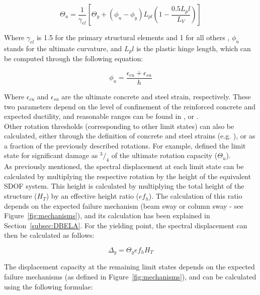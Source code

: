 \begin{equation}
	\Theta_u = \frac{1}{\gamma_{el}}\left[\Theta_y + (\phi_u-\phi_y)L_{pl}\left(1-\frac{0.5L_pl}{L_V}\right)\right]
\end{equation}

Where $\gamma_{el}$ is 1.5 for the primary structural elements and 1 for all others \citep{BorziEtAl2008b}, $\phi_u$ stands for the ultimate curvature, and $L_pl$ is the plastic hinge length, which can be computed through the following equation:

\begin{equation}
	\phi_u = \frac{\epsilon_{cu}+\epsilon_{su}}{h}
\end{equation}

Where $\epsilon_{cu}$ and $\epsilon_{su}$ are the ultimate concrete and steel strain, respectively. These two parameters depend on the level of confinement of the reinforced concrete and expected ductility, and reasonable ranges can be found in \cite{Calvi1999}, \cite{CrowleyEtAl2004} or \cite{BalEtAl2010}.\\

Other rotation thresholds (corresponding to other limit states) can also be calculated, either through the definition of concrete and steel strains (e.g. \cite{CrowleyEtAl2004}), or as a fraction of the previously described rotations. For example, \cite{BorziEtAl2008b} defined the limit state for significant damage as $^3/_4$ of the ultimate rotation capacity ($\Theta_u$).\\

As previously mentioned, the spectral displacement at each limit state can be calculated by multiplying the respective rotation by the height of the equivalent SDOF system. This height is calculated by multiplying the total height of the structure ($H_T$) by an effective height ratio ($ef_h$). The calculation of this ratio depends on the expected failure mechanism (beam sway or column sway - see Figure~\ref{fig:mechanisms}), and its calculation has been explained in Section~\ref{subsec:DBELA}. For the yielding point, the spectral displacement can then be calculated as follows:

\begin{equation}
	\Delta_y = \Theta_yef_hH_T
\end{equation}

The displacement capacity at the remaining limit states depends on the expected failure mechanisms (as defined in Figure~\ref{fig:mechanisms}), and can be calculated using the following formulae:\\

